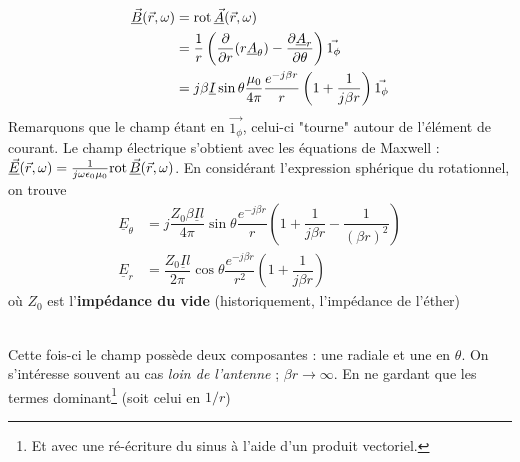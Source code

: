 	\begin{equation}
	\begin{split}
	\underline{\vec{B}}(\vec{r},\omega) &= \text{rot}\, \underline{\vec{A}}(\vec{r},\omega)\\
	&=\dfrac{1}{r}\left(\dfrac{\partial}{\partial r}(r\underline{A}_\theta)-\dfrac{\partial 
	\underline{A}_r}{\partial \theta}\right)\vec{1_\phi}\\
	&= j\beta\underline{I}\sin\theta\dfrac{\mu_0}{4\pi}\dfrac{e^{-j\beta r}}{r}\left(1+
	\dfrac{1}{j\beta r}\right)\vec{1_\phi}
	\end{split}
	\end{equation}
	Remarquons que le champ étant en $\vec{1_\phi}$, celui-ci "tourne" autour de l'élément 
	de courant.	Le champ électrique s'obtient avec les équations de Maxwell : 
	$\underline{\vec{E}}(\vec{r},\omega) = \frac{1}{j\omega\epsilon_0\mu_0}\text{rot}\,\underline{
	\vec{B}}(\vec{r},\omega)$. En considérant l'expression sphérique du rotationnel, on 
	trouve
	\begin{equation}
	\begin{split}
	\underline{E}_\theta &= j\dfrac{Z_0\beta\underline{I}l}{4\pi}\sin\theta\dfrac{e^{-j\beta r}}{
	r} \left(1+\dfrac{1}{j\beta r}-\dfrac{1}{(\beta r)^2}\right)\\
	\underline{E}_r &= \dfrac{Z_0\underline{I}l}{2\pi}\cos\theta \dfrac{e^{-j\beta r}}{r^2}
	\left(1+\dfrac{1}{j\beta r}\right)
	\end{split}
	\end{equation}
	où $Z_0$ est l'\textbf{impédance du vide} (historiquement, l'impédance de l'éther)\\
	
	\ 
	
	Cette fois-ci le champ possède deux composantes : une radiale et une en $\theta$. 
	On s'intéresse souvent au cas \textit{loin de l'antenne} ; $\beta r \rightarrow\infty$. 
	En ne gardant que les termes dominant\footnote{Et avec une ré-écriture du sinus à l'aide 
	d'un produit vectoriel.} (soit celui en $1/r$)
	\ \\
	
